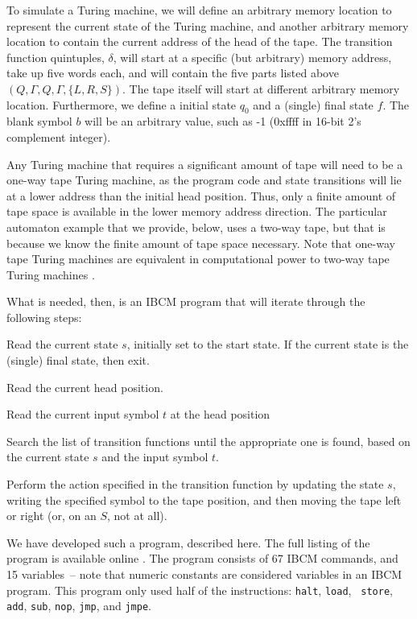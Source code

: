 To simulate a Turing machine, we will define an arbitrary memory
location to represent the current state of the Turing machine, and
another arbitrary memory location to contain the current address of
the head of the tape.  The transition function quintuples, $\delta$,
will start at a specific (but arbitrary) memory address, take up five
words each, and will contain the five parts listed above
$(Q,\Gamma,Q,\Gamma,\{L,R,S\})$.  The tape itself will start at
different arbitrary memory location.  Furthermore, we define a initial
state $q_0$ and a (single) final state $f$.  The blank symbol $b$ will
be an arbitrary value, such as -1 (0xffff in 16-bit 2's complement
integer).

Any Turing machine that requires a significant amount of tape will
need to be a one-way tape Turing machine, as the program code and
state transitions will lie at a lower address than the initial head
position.  Thus, only a finite amount of tape space is available in
the lower memory address direction.  The particular automaton example
that we provide, below, uses a two-way tape, but that is because we
know the finite amount of tape space necessary.  Note that one-way
tape Turing machines are equivalent in computational power to two-way
tape Turing machines \cite{HopcroftAndUllman}.

What is needed, then, is an IBCM program that will iterate through the
following steps:

\begin{itemlist}
\item Read the current state $s$, initially set to the start state.
  If the current state is the (single) final state, then exit.
\item Read the current head position.
\item Read the current input symbol $t$ at the head position
\item Search the list of transition functions until the appropriate
  one is found, based on the current state $s$ and the input symbol
  $t$.
\item Perform the action specified in the transition function by
  updating the state $s$, writing the specified symbol to the tape
  position, and then moving the tape left or right (or, on an $S$, not
  at all).
\end{itemlist}

We have developed such a program, described here.  The full listing of
the program is available online \cite{ibcm-website}.  The program
consists of 67 IBCM commands, and 15 variables~-- note that numeric
constants are considered variables in an IBCM program.  This program
only used half of the instructions: {\tt halt}, {\tt load}, {\tt
  store}, {\tt add}, {\tt sub}, {\tt nop}, {\tt jmp}, and {\tt jmpe}.

